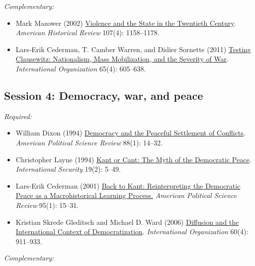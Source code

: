 \documentclass[12pt, a4paper]{article}
\begin{document}
\noindent\textit{Complementary:}

\begin{itemize}
	\item Mark Mazower (2002) \href{https://doi.org/10.1086/ahr/107.4.1158}{Violence and the State in the Twentieth Century}. \textit{American Historical Review} 107(4): 1158--1178.
	\item Lars-Erik Cederman, T.	Camber Warren, and Didier Sornette (2011) \href{https://doi.org/10.1017/S0020818311000245}{Testing Clausewitz: Nationalism, Mass Mobilization, and the Severity of War}. \textit{International Organization} 65(4): 605--638.
\end{itemize}

\vspace{20pt}
\hline
\subsection*{Session 4: Democracy, war, and peace}

\noindent\textit{Required:}

\begin{itemize}
	\item William Dixon (1994) \href{https://doi.org/10.2307/2944879}{Democracy and the Peaceful Settlement of Conflicts}. \textit{American Political Science Review} 88(1): 14--32.
	\item Christopher Layne (1994) \href{https://doi.org/10.2307/2539195}{Kant or Cant: The Myth of the Democratic Peace}. \textit{International Security} 19(2): 5--49.
  \item Lars-Erik Cederman (2001) \href{https://doi.org/10.1017/S0003055401000028}{Back to Kant: Reinterpreting the Democratic Peace as a Macrohistorical Learning Process.} \textit{American Political Science Review} 95(1): 15--31.
	\item Kristian Skrede Gleditsch and Michael D. Ward (2006) \href{https://doi.org/10.1017/S0020818306060309}{Diffusion and the International Context of Democratization}. \textit{International Organization} 60(4): 911--933.
	\end{itemize}

\newpage
\noindent\textit{Complementary:}
\end{document}
